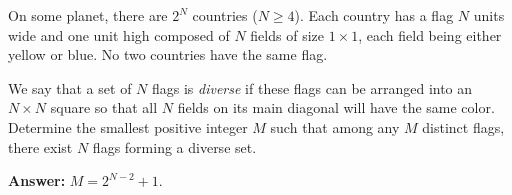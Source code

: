 On some planet, there are $2^N$ countries ($N \geq 4$). Each country has a flag $N$ units wide and one unit high composed of $N$ fields of size $1 \times 1$, each field being either yellow or blue. No two countries have the same flag.

We say that a set of $N$ flags is \emph{diverse} if these flags can be arranged into an $N \times N$ square so that all $N$ fields on its main diagonal will have the same color. Determine the smallest positive integer $M$ such that among any $M$ distinct flags, there exist $N$ flags forming a diverse set.

\textbf{Answer:} $M = 2^{N-2} + 1$.
